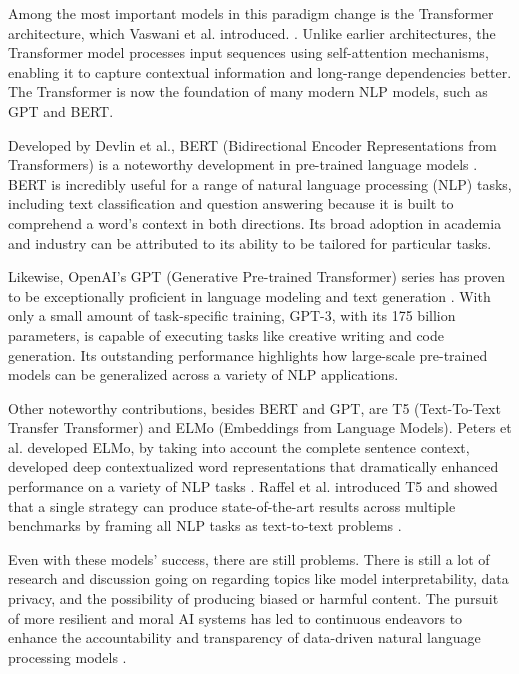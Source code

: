 Among the most important models in this paradigm change is the Transformer architecture, which Vaswani et al. introduced. \cite{vaswani2017attention}. Unlike earlier architectures, the Transformer model processes input sequences using self-attention mechanisms, enabling it to capture contextual information and long-range dependencies better. The Transformer is now the foundation of many modern NLP models, such as GPT and BERT.

Developed by Devlin et al., BERT (Bidirectional Encoder Representations from Transformers) is a noteworthy development in pre-trained language models \cite{devlin2018bert}. BERT is incredibly useful for a range of natural language processing (NLP) tasks, including text classification \cite{rahman2022bert} and question answering \cite{qu2019bert} because it is built to comprehend a word's context in both directions. Its broad adoption in academia and industry can be attributed to its ability to be tailored for particular tasks. 

Likewise, OpenAI's GPT (Generative Pre-trained Transformer) series has proven to be exceptionally proficient in language modeling and text generation \cite{radford2019language}. With only a small amount of task-specific training, GPT-3, with its 175 billion parameters, is capable of executing tasks like creative writing and code generation. Its outstanding performance highlights how large-scale pre-trained models can be generalized across a variety of NLP applications.

Other noteworthy contributions, besides BERT and GPT, are T5 (Text-To-Text Transfer Transformer) and ELMo (Embeddings from Language Models). Peters et al. developed ELMo, by taking into account the complete sentence context, developed deep contextualized word representations that dramatically enhanced performance on a variety of NLP tasks \cite{peters2018deep}. Raffel et al. introduced T5 and showed that a single strategy can produce state-of-the-art results across multiple benchmarks by framing all NLP tasks as text-to-text problems \cite{raffel2019exploring}. 

Even with these models' success, there are still problems. There is still a lot of research and discussion going on regarding topics like model interpretability, data privacy, and the possibility of producing biased or harmful content. The pursuit of more resilient and moral AI systems has led to continuous endeavors to enhance the accountability and transparency of data-driven natural language processing models \cite{mitchell2019model, bender2021dangers}.


